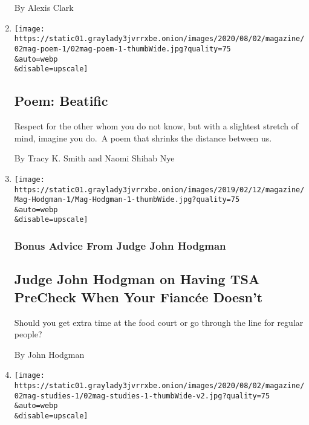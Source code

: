 \begin{enumerate}
  By Alexis Clark
\item
  \href{/2020/07/30/magazine/poem-beatific.html}{}

  \texttt{[image: https://static01.graylady3jvrrxbe.onion/images/2020/08/02/magazine/02mag-poem-1/02mag-poem-1-thumbWide.jpg?quality=75\\\&auto=webp\\\&disable=upscale]}

  \hypertarget{poem-beatific}{%
  \subsection{Poem: Beatific}\label{poem-beatific}}

  Respect for the other whom you do not know, but with a slightest
  stretch of mind, imagine you do.~A poem that shrinks the distance
  between us.

  By Tracy K. Smith and Naomi Shihab Nye
\item
  \href{/2020/07/30/magazine/judge-john-hodgman-on-having-tsa-precheck-when-your-fiancee-doesnt.html}{}

  \texttt{[image: https://static01.graylady3jvrrxbe.onion/images/2019/02/12/magazine/Mag-Hodgman-1/Mag-Hodgman-1-thumbWide.jpg?quality=75\\\&auto=webp\\\&disable=upscale]}

  \hypertarget{bonus-advice-from-judge-john-hodgman}{%
  \subsubsection{Bonus Advice From Judge John
  Hodgman}\label{bonus-advice-from-judge-john-hodgman}}

  \hypertarget{judge-john-hodgman-on-having-tsa-precheck-when-your-fiancuxe9e-doesnt}{%
  \subsection{Judge John Hodgman on Having TSA PreCheck When Your
  Fiancée
  Doesn't}\label{judge-john-hodgman-on-having-tsa-precheck-when-your-fiancuxe9e-doesnt}}

  Should you get extra time at the food court or go through the line for
  regular people?

  By John Hodgman
\item
  \href{/2020/07/29/magazine/schools-reopening-covid.html}{}

  \texttt{[image: https://static01.graylady3jvrrxbe.onion/images/2020/08/02/magazine/02mag-studies-1/02mag-studies-1-thumbWide-v2.jpg?quality=75\\\&auto=webp\\\&disable=upscale]}


\end{enumerate}
